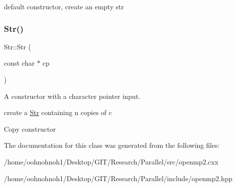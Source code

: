 default constructor, create an empty str \mbox{\label{classStr_a8235816d2687bf223490568a18124cf4}} 
\subsubsection{\texorpdfstring{Str()}{Str()}\hspace{0.1cm}{\footnotesize\ttfamily [2/2]}}
{\footnotesize\ttfamily Str\+::\+Str (\begin{DoxyParamCaption}\item[{const char $\ast$}]{cp }\end{DoxyParamCaption})\hspace{0.3cm}{\ttfamily [inline]}}



A constructor with a character pointer input. 

create a \hyperlink{classStr}{Str} containing n copies of c

Copy constructor 

The documentation for this class was generated from the following files\+:\begin{DoxyCompactItemize}
\item 
/home/oohnohnoh1/\+Desktop/\+G\+I\+T/\+Research/\+Parallel/src/openmp2.\+cxx\item 
/home/oohnohnoh1/\+Desktop/\+G\+I\+T/\+Research/\+Parallel/include/openmp2.\+hpp\end{DoxyCompactItemize}
